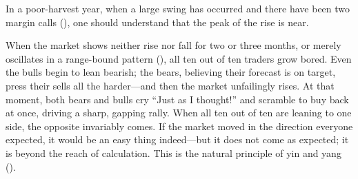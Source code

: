 \begin{sokyubox}
{\small\itshape\color{sokyubar} }

\medskip
In a poor-harvest year, when a large swing has occurred and there
have been two margin calls (), one should
understand that the peak of the rise is near.
\end{sokyubox}


\begin{sokyubox}
{\small\itshape\color{sokyubar} }

\medskip
When the market shows neither rise nor fall for two or three months,
or merely oscillates in a range-bound pattern (),
all ten out of ten traders grow bored. Even the bulls begin to lean
bearish; the bears, believing their forecast is on target, press
their sells all the harder---and then the market unfailingly rises.
At that moment, both bears and bulls cry ``Just as I thought!'' and
scramble to buy back at once, driving a sharp, gapping rally. When
all ten out of ten are leaning to one side, the opposite invariably
comes. If the market moved in the direction everyone expected, it
would be an easy thing indeed---but it does not come as expected;
it is beyond the reach of calculation. This is the natural
principle of yin and yang ().
\end{sokyubox}

